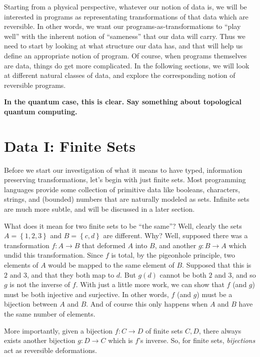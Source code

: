 \documentclass{article}
\newcommand{\amr}[1]{\fbox{Amr says:} \textbf{#1}}
\begin{document}
Starting from a physical perspective, whatever our notion of data
is, we will be interested in programs as representating transformations
of that data which are reversible. In other words, we want our
programs-as-transformations to ``play well'' with the inherent notion
of ``sameness'' that our data will carry. Thus we need to start by
looking at what structure our data has, and that will help us define
an appropriate notion of program. Of course, when programs themselves
are data, things do get more complicated.  In the following sections,
we will look at different natural classes of data, and explore the
corresponding notion of reversible programs.

\amr{In the quantum case, this is clear. Say something about topological
quantum computing.}

\section{Data I: Finite Sets}

Before we start our investigation of what it means to have typed,
information preserving transformations, let's begin with just
finite sets. Most programming languages provide some collection of primitive
data like booleans, characters, strings, and (bounded) numbers that are
naturally modeled as sets. Infinite sets are much more subtle, and will be
discussed in a later section.

What does it mean for two finite sets to be ``the same''?  Well, clearly the
sets $A = \left\{1, 2, 3\right\}$ and $B = \left\{c, d\right\}$ are different.
Why?  Well, supposed there was a transformation $f : A \rightarrow B$ that
deformed $A$ into $B$, and another $g : B \rightarrow A$ which undid this
transformation. Since $f$ is total, by the pigeonhole principle, two elements
of $A$ would be mapped to the same element of $B$. Supposed that this is $2$ and
$3$, and that they both map to $d$.  But $g(d)$ cannot be both $2$ and $3$, and
so $g$ is not the inverse of $f$. With just a little more work, we can show
that $f$ (and $g$) must be both injective and surjective. In other words,
$f$ (and $g$) must be a bijection between $A$ and $B$.  And of course this 
only happens when $A$ and $B$ have the same number of elements.

More importantly, given a bijection $f : C \rightarrow D$ of finite sets
$C,D$, there always exists another bijection $g : D \rightarrow C$ which is
$f$'s inverse. So, for finite sets, \emph{bijections} act as reversible
deformations.
\end{document}
